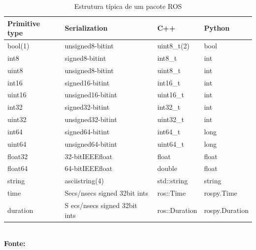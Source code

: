 \begin{table}[ht]
	\caption{Estrutura típica de um pacote ROS }
    \begin{center}
        \begin{tabular}{llll}
        \hline
        \textbf{Primitive type} & \textbf{Serialization} & \textbf{C++} & \textbf{Python} \\ \hline\hline
        bool(1)     & unsigned8-bitint              & uint8\_t(2)  & bool            \\ 
        int8        & signed8-bitint                & int8\_t      & int             \\ 
        uint8       & unsigned8-bitint              & uint8\_t     & int             \\ 
        int16       & signed16-bitint               & int16\_t     & int             \\ 
        uint16      & unsigned16-bitint             & uint16\_t    & int             \\ 
        int32       & signed32-bitint               & int32\_t     & int             \\ 
        uint32      & unsigned32-bitint             & uint32\_t    & int             \\ 
        int64       & signed64-bitint               & int64\_t     & long            \\ 
        uint64      & unsigned64-bitint             & uint64\_t    & long            \\ 
        float32     & 32-bitIEEEfloat               & float        & float           \\ 
        float64     & 64-bitIEEEfloat               & double       & float           \\ 
        string      & asciistring(4)                & std::string  & string          \\ 
        time        & Secs/nsecs signed 32bit ints  & ros::Time    & rospy.Time      \\ 
        duration    &S ecs/nsecs signed 32bit ints  & ros::Duration& rospy.Duration  \\ \hline
        \end{tabular}
        \\{\small \textbf{Fonte:} }
    \end{center}\label{tab:rostype}

\end{table}


